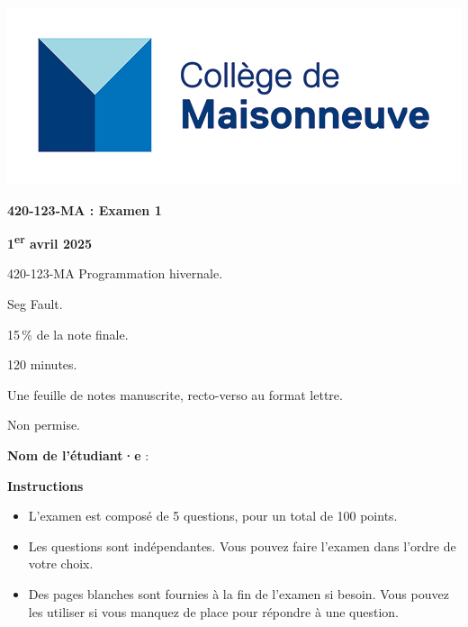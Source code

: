 \documentclass[letterpaper, 12pt]{article}
\begin{document}
\begin{titlepage}

    \begin{center}

    \includegraphics{logo_maisonneuve.png} 
    \vspace{1cm}

    {\Huge\bfseries 420-123-MA : Examen 1\par}
    \vspace{1cm}

    {\large\bfseries 1\textsuperscript{er} avril 2025\par}
    \vfill

    \end{center}

    \begin{description}[leftmargin=0pt]
        \item[Cours] 420-123-MA Programmation hivernale.
        \item[Professeur] Seg Fault.
        \item[Pondération] 15\,\% de la note finale.
        \item[Durée] 120 minutes.
        \item[Documentation] Une feuille de notes manuscrite, recto-verso au
        format lettre.
        \item[Intelligence artificielle] Non permise.
    \end{description}

    \vfill

    \noindent
    {\large\bfseries {Nom de l’étudiant·e}} : \hrulefill

    \vfill

    \noindent
    {\large\bfseries Instructions\par}
    \begin{itemize}
        \item L'examen est composé de 5 questions, pour un total de 100 points.
        \item Les questions sont indépendantes. Vous pouvez faire l'examen dans
        l'ordre de votre choix.
        \item Des pages blanches sont fournies à la fin de l'examen si besoin. Vous pouvez
        les utiliser si vous manquez de place pour répondre à une question.
    \end{itemize}

    \vfill
\end{titlepage}
\end{document}
